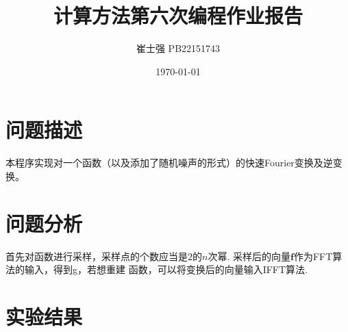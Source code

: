 \documentclass[UTF8]{ctexart}
\title{计算方法第六次编程作业报告}
\author{崔士强 PB22151743}
\date{\today}
\begin{document}
\maketitle

\section{问题描述}
本程序实现对一个函数（以及添加了随机噪声的形式）的快速Fourier变换及逆变换。

\section{问题分析}
首先对函数进行采样，采样点的个数应当是$2$的$n$次幂. 采样后的向量$\mathbf{f}$作为FFT算法的输入，得到g，若想重建
函数，可以将变换后的向量输入IFFT算法.

\section{实验结果}
\end{document}

